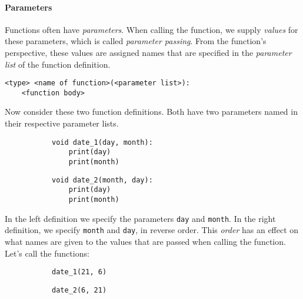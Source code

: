 \paragraph{Parameters}

Functions often have \emph{parameters}. When calling the function, we supply \emph{values} for these parameters, which is called \emph{parameter passing}. From the function's perspective, these values are assigned names that are specified in the \emph{parameter list} of the function definition.

\begin{verbatim}
<type> <name of function>(<parameter list>):
    <function body>
\end{verbatim}

Now consider these two function definitions. Both have two parameters named in their respective parameter lists.

\begin{figure}[h]
\begin{subfigure}[b]{.5\linewidth}
\begin{verbatim}
void date_1(day, month):
    print(day)
    print(month)
\end{verbatim}
\end{subfigure}
\begin{subfigure}[b]{.5\linewidth}
\begin{verbatim}
void date_2(month, day):
    print(day)
    print(month)
\end{verbatim}
\end{subfigure}
\end{figure}

In the left definition we specify the parameters \texttt{day} and \texttt{month}. In the right definition, we specify \texttt{month} and \texttt{day}, in reverse order. This \emph{order} has an effect on what names are given to the values that are passed when calling the function. Let's call the functions:

\begin{figure}[h]
\begin{subfigure}[b]{.5\linewidth}
\begin{verbatim}
date_1(21, 6)
\end{verbatim}
\end{subfigure}
\begin{subfigure}[b]{.5\linewidth}
\begin{verbatim}
date_2(6, 21)
\end{verbatim}
\end{subfigure}
\end{figure}

